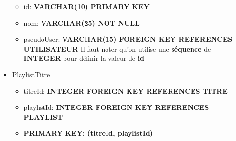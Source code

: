 \documentclass[a4paper,12pt, french]{report}
\begin{document}
\begin{itemize}
        \begin{itemize}
          \item id: \textbf{VARCHAR(10) PRIMARY KEY}
          \item nom: \textbf{VARCHAR(25) NOT NULL}
          \item pseudoUser: \textbf{VARCHAR(15) FOREIGN KEY REFERENCES UTILISATEUR}
          Il faut noter qu'on utilise une \textbf{séquence} de \textbf{INTEGER} pour définir la valeur de \textbf{id}
        \end{itemize}
      \item PlaylistTitre
        \begin{itemize}
          \item titreId: \textbf{INTEGER FOREIGN KEY REFERENCES TITRE}
          \item playlistId: \textbf{INTEGER FOREIGN KEY REFERENCES PLAYLIST}
          \item \textbf{PRIMARY KEY: (titreId, playlistId)}
        \end{itemize}
      \end{itemize}
\end{document}
